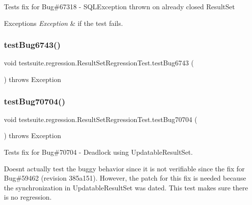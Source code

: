Tests fix for Bug\#67318 -\/ S\+Q\+L\+Exception thrown on already closed Result\+Set


\begin{DoxyExceptions}{Exceptions}
{\em Exception} & if the test fails. \\
\hline
\end{DoxyExceptions}
\mbox{\label{classtestsuite_1_1regression_1_1_result_set_regression_test_a7554fa92dd3ec004371bce0ace54f245}} 
\subsubsection{\texorpdfstring{test\+Bug6743()}{testBug6743()}}
{\footnotesize\ttfamily void testsuite.\+regression.\+Result\+Set\+Regression\+Test.\+test\+Bug6743 (\begin{DoxyParamCaption}{ }\end{DoxyParamCaption}) throws Exception}

\mbox{\label{classtestsuite_1_1regression_1_1_result_set_regression_test_adff3e595315840e31279f6e60ea8ae4c}} 
\subsubsection{\texorpdfstring{test\+Bug70704()}{testBug70704()}}
{\footnotesize\ttfamily void testsuite.\+regression.\+Result\+Set\+Regression\+Test.\+test\+Bug70704 (\begin{DoxyParamCaption}{ }\end{DoxyParamCaption}) throws Exception}

Tests fix for Bug\#70704 -\/ Deadlock using Updatable\+Result\+Set.

Doesn\textquotesingle{}t actually test the buggy behavior since it is not verifiable since the fix for Bug\#59462 (revision 385a151). However, the patch for this fix is needed because the synchronization in Updatable\+Result\+Set was dated. This test makes sure there is no regression.

